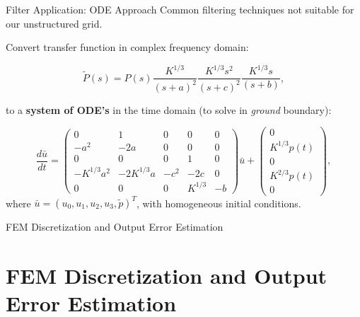 \documentclass{beamer}
\newcounter{sectionframecount}
\begin{document}
\begin{frame}[t]{Filter Application: ODE Approach}
\vspace{-10pt}
Common filtering techniques not suitable for our unstructured grid.

\vspace{8pt}
Convert transfer function in complex frequency domain:

\begin{equation}
  \tilde{P}(s) =P(s)\dfrac{K^{1/3}}{(s+a)^2}\dfrac{K^{1/3}s^2}{(s+c)^2}\dfrac{K^{1/3}s}{(s+b)},
\end{equation}

to a \textbf{system of ODE's} in the time domain (to solve in \textit{ground} boundary):

\begin{equation}
  \dfrac{d\bar{u}}{dt} =
      \begin{pmatrix}
          0 & 1 & 0 & 0 & 0\\
          -a^2 & -2a & 0 & 0 & 0\\
          0 & 0 & 0 & 1 & 0\\
          -K^{1/3}a^2 & -2K^{1/3}a & -c^2 & -2c & 0\\
          0 & 0 & 0 &K^{1/3} & -b
      \end{pmatrix}
      \bar{u}
      +
      \begin{pmatrix}
          0 \\
          K^{1/3}p(t)\\
          0\\
          K^{2/3}p(t)\\
          0
      \end{pmatrix},
  \end{equation}
where $\bar{u}=(u_0,u_1,u_2,u_3,\tilde{p})^T$, with homogeneous initial conditions.
\end{frame}


\begin{frame}[plain]
  \vfill
  \centering
  {FEM Discretization and Output Error Estimation}
  \vfill
\end{frame}

\section{FEM Discretization and Output Error Estimation}
\end{document}
